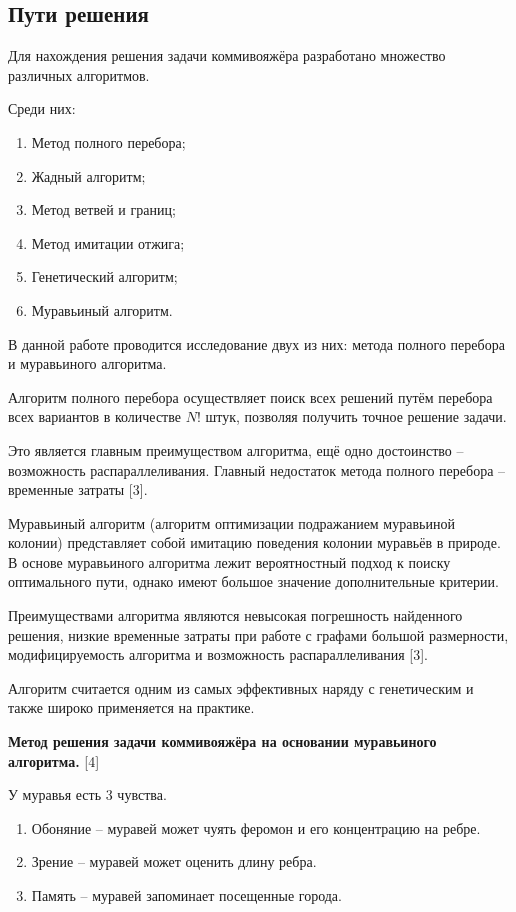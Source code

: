 \documentclass[a4paper,14pt]{article} %
\begin{document}
       \subsection{Пути решения}
        
        Для нахождения решения задачи коммивояжёра разработано множество различных алгоритмов. 
        
        Среди них:
        \begin{enumerate}
		\item Метод полного перебора; 
		\item Жадный алгоритм; 
		\item Метод ветвей и границ; 
		\item Метод имитации отжига;
		\item Генетический алгоритм; 
		\item Муравьиный алгоритм.
	\end{enumerate}
	
	В данной работе проводится исследование двух из них: метода полного перебора и муравьиного алгоритма. 
	
	Алгоритм полного перебора осуществляет поиск всех решений путём перебора всех вариантов в количестве $N!$ штук, позволяя получить точное решение задачи. 
	
	Это является главным преимуществом алгоритма, ещё одно достоинство – возможность распараллеливания. Главный недостаток метода полного перебора – временные затраты [3]. 
	
	Муравьиный алгоритм (алгоритм оптимизации подражанием муравьиной колонии) представляет собой имитацию поведения колонии муравьёв в природе. В основе муравьиного алгоритма лежит вероятностный подход к поиску оптимального пути, однако имеют большое значение дополнительные критерии.
	
	Преимуществами алгоритма являются невысокая погрешность найденного решения, низкие временные затраты при работе с графами большой размерности, модифицируемость алгоритма и возможность распараллеливания [3]. 
	
	Алгоритм считается одним из самых эффективных наряду с генетическим и также широко применяется на практике.
	
	\hfill
	
	\textbf{Метод решения задачи коммивояжёра на основании муравьиного алгоритма. } [4]
	
	У муравья есть 3 чувства. 
	
	\begin{enumerate}
		\item Обоняние -- муравей может чуять феромон и его концентрацию на ребре. 
		\item Зрение -- муравей может оценить длину ребра. 
		\item Память -- муравей запоминает посещенные города.  
	\end{enumerate}
	
\end{document}
